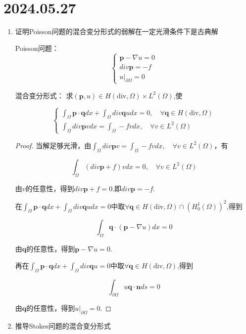 \documentclass[12pt,a4paper]{article}
\begin{document}
	
	\noindent
	
	\section*{2024.05.27}	
	
	\begin{enumerate}
		\item 证明Poisson问题的混合变分形式的弱解在一定光滑条件下是古典解
		
		Poisson问题：
		$$\begin{cases}
			\mathbf{p} - \nabla u = 0 \\
			div \mathbf{p} = - f \\
			u |_{\partial \Omega} = 0
		\end{cases}$$
		
		混合变分形式：
		求$(\mathbf{p},u)\in H(\mathrm{div},\Omega)\times L^2(\Omega)$,使
		
		$$\begin{cases}
			\int_\Omega \mathbf{p}\cdot\mathbf{q} dx + \int_\Omega div\mathbf{q} u dx= 0,\quad \forall \mathbf{q} \in H(\mathrm{div},\Omega) \\
			\int_\Omega div\mathbf{p} v dx= \int_\Omega -f v dx,\quad \forall v \in L^2(\Omega)
		\end{cases}$$
		
		\begin{proof}
			当解足够光滑，由$	\int_\Omega div\mathbf{p} v = \int_\Omega -f v dx,\quad \forall v \in L^2(\Omega) $，有
			
			$$	\int_\Omega (div\mathbf{p} + f) v dx =0 ,\quad \forall v \in L^2(\Omega)$$
			
			由$v$的任意性，得到$div\mathbf{p} + f = 0$.即$div\mathbf{p} = -f$.
			
			在$\int_\Omega \mathbf{p}\cdot\mathbf{q} dx + \int_\Omega div\mathbf{q} u dx= 0$中取$\forall \mathbf{q} \in H(\mathrm{div},\Omega) \cap (H_0^1(\Omega))^2$,得到
			
			$$\int_{\Omega} \mathbf{q}\cdot(\mathbf{p}-\nabla u) dx= 0$$
			
			由$\mathbf{q}$的任意性，得到$	\mathbf{p} - \nabla u = 0$.
			
			再在$\int_\Omega \mathbf{p}\cdot\mathbf{q} dx + \int_\Omega div\mathbf{q} u = 0$中取$\forall \mathbf{q} \in H(\mathrm{div},\Omega)$,得到
			
			$$\int_{\partial \Omega} u \mathbf{q}\cdot\mathbf{n} ds= 0$$
			
			由$\mathbf{q}$的任意性，得到$	u |_{\partial \Omega} = 0$.
		\end{proof}
		\item 推导Stokes问题的混合变分形式
		

\end{enumerate}
\end{document}
